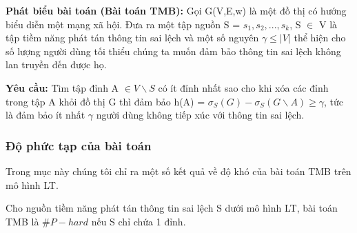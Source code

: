 \textbf{Phát biểu bài toán (Bài toán TMB):} Gọi G(V,E,w) là một đồ thị có hướng biểu diễn một mạng xã hội. Đưa ra một tập nguồn S = {$s_{1}, s_{2}, ... , s_{k}$}, S $\in$ V là tập tiềm năng phát tán thông tin sai lệch và một số nguyên $\gamma \leq | V |$ thể hiện cho số lượng người dùng tối thiểu chúng ta muốn đảm bảo thông tin sai lệch không lan truyền đến được họ.

\textbf{Yêu cầu:} Tìm tập đỉnh A $\in V \backslash S$ có ít đỉnh nhất sao cho khi xóa các đỉnh trong tập A khỏi đồ thị G thì đảm bảo h(A) = $\sigma_{S}(G) - \sigma_{S}(G \backslash A) \geq \gamma$, tức là đảm bảo ít nhất $\gamma$ người dùng không tiếp xúc với thông tin sai lệch.
\subsubsection{Độ phức tạp của bài toán}		
Trong mục này chúng tôi chỉ ra một số kết quả về độ khó của bài toán TMB trên mô hình LT.
\begin{theo}
	Cho nguồn tiềm năng phát tán thông tin sai lệch S dưới mô hình LT, bài toán TMB là $\#P-hard$ nếu S chỉ chứa 1 đỉnh.
\end{theo}
